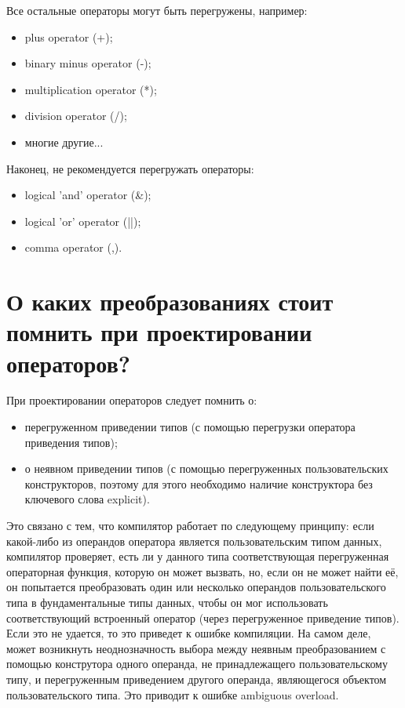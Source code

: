 \documentclass[a4paper,12pt]{article}	%
\begin{document}
	Все остальные операторы могут быть перегружены, например:
	
	\begin{itemize}
	
	\item plus operator (+);
	\item binary minus operator (-);
	\item multiplication operator (*);
	\item division operator (/);
	\item многие другие...
	
	\end{itemize}

	Наконец, не рекомендуется перегружать операторы:
	
	\begin{itemize}
	
	\item logical 'and' operator (\&);
	
	\item logical 'or' operator (||);
	
	\item comma operator (,).
	
	\end{itemize}
	
\newpage

\section{О каких преобразованиях стоит помнить при проектировании операторов?}
	
	При проектировании операторов следует помнить о:
		
	\begin{itemize}
	
	\item перегруженном приведении типов (с помощью перегрузки оператора приведения типов); 
	
	\item о неявном приведении типов (с помощью перегруженных пользовательских конструкторов, поэтому для этого необходимо наличие конструктора без ключевого слова explicit).
	
	\end{itemize}

	Это связано с тем, что компилятор работает по следующему принципу: если какой-либо из операндов оператора является пользовательским типом данных, компилятор проверяет, есть ли у данного типа соответствующая перегруженная операторная функция, которую он может вызвать, но, если он не может найти её, он попытается преобразовать один или несколько операндов пользовательского типа в фундаментальные типы данных, чтобы он мог использовать соответствующий встроенный оператор (через перегруженное приведение типов). Если это не удается, то это приведет к ошибке компиляции. На самом деле, может возникнуть неоднозначность выбора между неявным преобразованием с помощью конструтора одного операнда, не принадлежащего пользовательскому типу, и перегруженным приведением другого операнда, являющегося объектом пользовательского типа. Это приводит к ошибке ambiguous overload.
\end{document}
